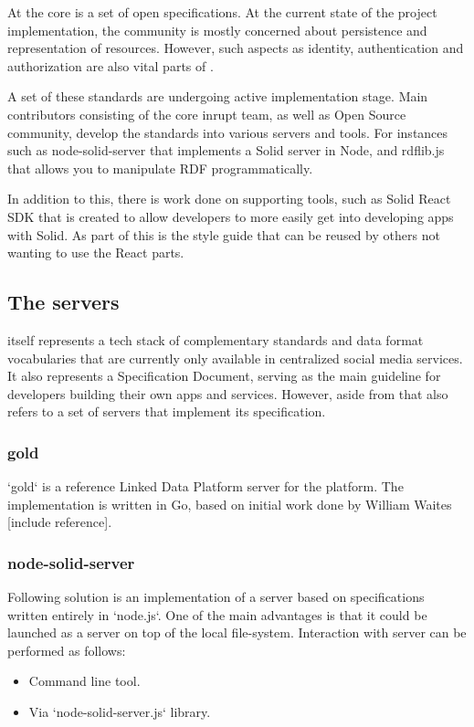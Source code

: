At the core \solid{} is a set of open specifications. At the current state of the project implementation, the community is mostly concerned about persistence and representation of resources. However, such aspects as identity, authentication and authorization are also vital parts of \solid{}.

A set of these standards are undergoing active implementation stage. Main contributors consisting of the core \solid{} inrupt team, as well as Open Source community, develop the standards into various servers and tools. For instances such as node-solid-server that implements a Solid server in Node, and rdflib.js that allows you to manipulate RDF programmatically.

In addition to this, there is work done on supporting tools, such as Solid React SDK that is created to allow developers to more easily get into developing apps with Solid. As part of this is the style guide that can be reused by others not wanting to use the React parts.

\subsection{The \solid{} servers}

\solid{} itself represents a tech stack of complementary standards and data format vocabularies that are currently only available in centralized social media services. It also represents a Specification Document, serving as the main guideline for developers building their own apps and services. However, aside from that \solid{} also refers to a set of servers that implement its specification. 

\subsubsection{gold}

`gold` is a reference Linked Data Platform server for the \solid{} platform. The implementation is written in Go, based on initial work done by William Waites [include reference].


\subsubsection{node-solid-server}

Following solution is an implementation of a server based on \solid{} specifications written entirely in `node.js`.
One of the main advantages is that it could be launched as a \solid{} server on top of the local file-system. Interaction with server can be performed as follows:
\begin{itemize}
	\item Command line tool.
    \item Via `node-solid-server.js` library.
\end{itemize}

